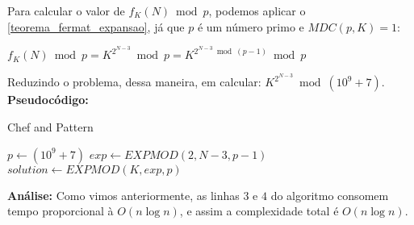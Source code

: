 Para calcular o valor de $f_K(N) \bmod p$, podemos aplicar o \autoref{teorema_fermat_expansao}, já que $p$ é um número primo e $MDC(p, K) = 1$:

$f_K(N) \bmod p = K^{2^{N-3}} \bmod p = K^{2^{N-3} \bmod (p-1)} \bmod p$ 

Reduzindo o problema, dessa maneira, em calcular: $K^{2^{N-3}} \bmod (10^9+7)$.
\\

\textbf{Pseudocódigo:}
\begin{algorithm}
\caption{Chef and Pattern}
\begin{algorithmic}[1]
\State $p \gets (10^9+7)$
\State $exp \gets EXPMOD(2, N-3, p-1)$ 
\State $solution \gets EXPMOD(K, exp, p)$ 
\State {}
\EndProcedure
\end{algorithmic}
\end{algorithm}

\textbf{Análise:}
Como vimos anteriormente, as linhas $3$ e $4$ do algoritmo consomem tempo proporcional à $O(n \log n)$, e assim a complexidade total é $O(n \log n)$.

